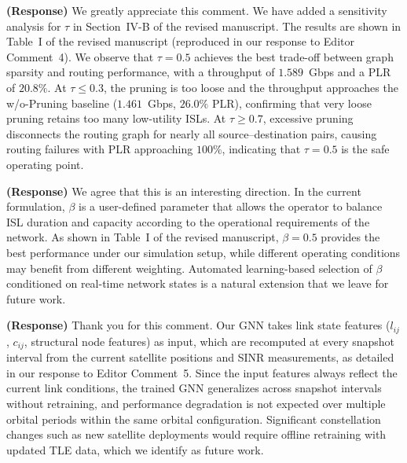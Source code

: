 \documentclass[letter]{article}
\begin{document}
\vspace{10mm}
\noindent {}

\vspace{5mm}
{\bf (Response)}
We greatly appreciate this comment. We have added a sensitivity analysis for $\tau$ in Section~IV-B of the revised manuscript. The results are shown in Table~I of the revised manuscript (reproduced in our response to Editor Comment~4). We observe that $\tau = 0.5$ achieves the best trade-off between graph sparsity and routing performance, with a throughput of $1.589$~Gbps and a PLR of $20.8\%$. At $\tau \leq 0.3$, the pruning is too loose and the throughput approaches the w/o-Pruning baseline ($1.461$~Gbps, $26.0\%$ PLR), confirming that very loose pruning retains too many low-utility ISLs. At $\tau \geq 0.7$, excessive pruning disconnects the routing graph for nearly all source--destination pairs, causing routing failures with PLR approaching $100\%$, indicating that $\tau = 0.5$ is the safe operating point.

\vspace{10mm}
\noindent {}

\vspace{5mm}
{\bf (Response)}
We agree that this is an interesting direction. In the current formulation, $\beta$ is a user-defined parameter that allows the operator to balance ISL duration and capacity according to the operational requirements of the network. As shown in Table~I of the revised manuscript, $\beta = 0.5$ provides the best performance under our simulation setup, while different operating conditions may benefit from different weighting. Automated learning-based selection of $\beta$ conditioned on real-time network states is a natural extension that we leave for future work.

\vspace{10mm}
\noindent {}

\vspace{5mm}
{\bf (Response)}
Thank you for this comment. Our GNN takes link state features ($l_{ij}$, $c_{ij}$, structural node features) as input, which are recomputed at every snapshot interval from the current satellite positions and SINR measurements, as detailed in our response to Editor Comment~5. Since the input features always reflect the current link conditions, the trained GNN generalizes across snapshot intervals without retraining, and performance degradation is not expected over multiple orbital periods within the same orbital configuration. Significant constellation changes such as new satellite deployments would require offline retraining with updated TLE data, which we identify as future work.
\end{document}
